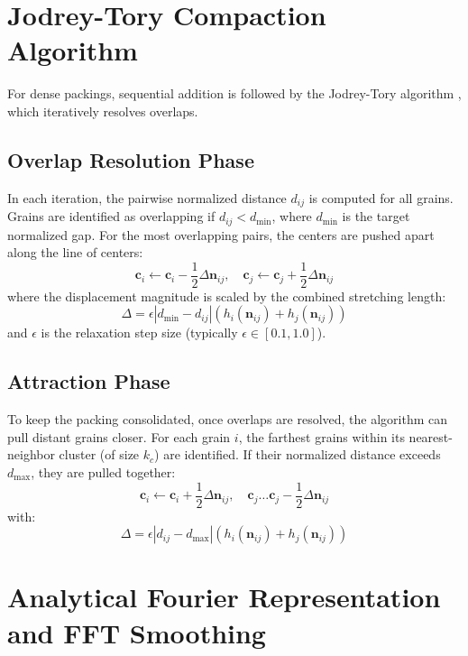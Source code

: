 \documentclass[preprint,12pt]{elsarticle}
\newcommand{\n}{\mathbf{n}}
\newcommand{\cvec}{\mathbf{c}}
\begin{document}
\section{Jodrey-Tory Compaction Algorithm}
\label{sec:jodrey_tory}

For dense packings, sequential addition is followed by the Jodrey-Tory algorithm \citep{jodrey1985computer}, which iteratively resolves overlaps.

\subsection{Overlap Resolution Phase}
In each iteration, the pairwise normalized distance $d_{ij}$ is computed for all grains. Grains are identified as overlapping if $d_{ij} < d_{\text{min}}$, where $d_{\text{min}}$ is the target normalized gap. For the most overlapping pairs, the centers are pushed apart along the line of centers:
\begin{equation}
\cvec_i \leftarrow \cvec_i - \frac{1}{2} \Delta \n_{ij}, \quad \cvec_j \leftarrow \cvec_j + \frac{1}{2} \Delta \n_{ij}
\end{equation}
where the displacement magnitude is scaled by the combined stretching length:
\begin{equation}
\Delta = \epsilon |d_{\text{min}} - d_{ij}| \left( h_i(\n_{ij}) + h_j(\n_{ij}) \right)
\end{equation}
and $\epsilon$ is the relaxation step size (typically $\epsilon \in [0.1, 1.0]$).

\subsection{Attraction Phase}
To keep the packing consolidated, once overlaps are resolved, the algorithm can pull distant grains closer. For each grain $i$, the farthest grains within its nearest-neighbor cluster (of size $k_c$) are identified. If their normalized distance exceeds $d_{\text{max}}$, they are pulled together:
\begin{equation}
\cvec_i \leftarrow \cvec_i + \frac{1}{2} \Delta \n_{ij}, \quad \cvec_j \dots \cvec_j - \frac{1}{2} \Delta \n_{ij}
\end{equation}
with:
\begin{equation}
\Delta = \epsilon |d_{ij} - d_{\text{max}}| \left( h_i(\n_{ij}) + h_j(\n_{ij}) \right)
\end{equation}

\section{Analytical Fourier Representation and FFT Smoothing}
\label{sec:fourier}
\end{document}
